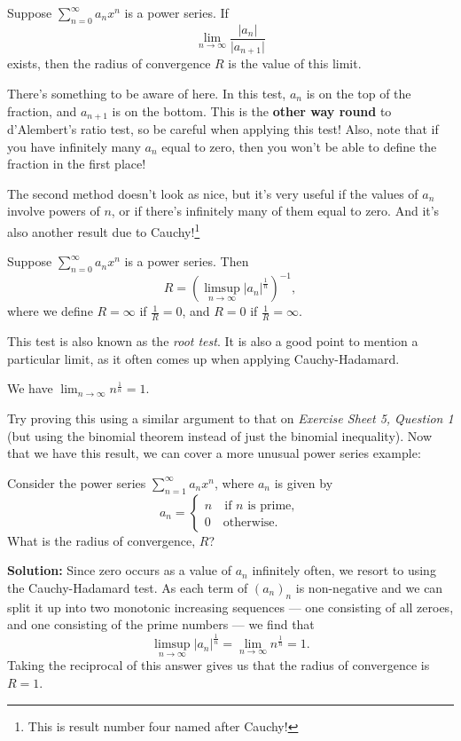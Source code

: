 \documentclass[
  10pt,
  a4paper]{article}
\theoremstyle{plain}
\theoremstyle{definition}
\theoremstyle{plain}
\theoremstyle{plain}
\theoremstyle{plain}
\theoremstyle{plain}
\theoremstyle{definition}
\theoremstyle{definition}
\theoremstyle{remark}
\theoremstyle{remark}
\let\BeginKnitrBlock\begin \let\EndKnitrBlock\end
\begin{document}
\BeginKnitrBlock{theorem}
{\label{thm:thm4} }Suppose \(\sum_{n = 0}^{\infty} a_n x^n\) is a power series. If \[\lim_{n \to \infty} \frac{\lvert a_n \rvert}{\lvert a_{n+1}\rvert}\] exists, then the radius of convergence \(R\) is the value of this limit.
\EndKnitrBlock{theorem}
There's something to be aware of here. In this test, \(a_n\) is on the top of the fraction, and \(a_{n+1}\) is on the bottom. This is the \textbf{other way round} to d'Alembert's ratio test, so be careful when applying this test! Also, note that if you have infinitely many \(a_n\) equal to zero, then you won't be able to define the fraction in the first place!

The second method doesn't look as nice, but it's very useful if the values of \(a_n\) involve powers of \(n\), or if there's infinitely many of them equal to zero. And it's also another result due to Cauchy!\footnote{This is result number four named after Cauchy!}

\BeginKnitrBlock{theorem}[Cauchy-Hadamard]
{\label{thm:thm5} }Suppose \(\sum_{n = 0}^{\infty} a_n x^n\) is a power series. Then \[R = \left(\limsup_{n\to\infty}\lvert a_n \rvert^{\frac{1}{n}}\right)^{-1},\] where we define \(R = \infty\) if \(\frac{1}{R} = 0\), and \(R = 0\) if \(\frac{1}{R} = \infty\).
\EndKnitrBlock{theorem}
This test is also known as the \emph{root test}. It is also a good point to mention a particular limit, as it often comes up when applying Cauchy-Hadamard.

\BeginKnitrBlock{proposition}
{\label{prp:prop2} }We have \(\lim_{n \to \infty} n^{\frac{1}{n}} = 1\).
\EndKnitrBlock{proposition}
Try proving this using a similar argument to that on \emph{Exercise Sheet 5, Question 1} (but using the binomial theorem instead of just the binomial inequality). Now that we have this result, we can cover a more unusual power series example:

\BeginKnitrBlock{example}
{\label{exm:ex2} }Consider the power series \(\sum_{n=1}^{\infty}a_n x^n\), where \(a_n\) is given by \[a_n = \begin{cases}
n \quad \text{if $n$ is prime},\\
0 \quad \text{otherwise}.
\end{cases}\]
What is the radius of convergence, \(R\)?
\EndKnitrBlock{example}
\textbf{Solution:}
Since zero occurs as a value of \(a_n\) infinitely often, we resort to using the Cauchy-Hadamard test. As each term of \((a_n)_n\) is non-negative and we can split it up into two monotonic increasing sequences --- one consisting of all zeroes, and one consisting of the prime numbers --- we find that \[\limsup_{n\to\infty}\lvert a_n \rvert^{\frac{1}{n}} = \lim_{n \to \infty} n^{\frac{1}{n}} = 1.\] Taking the reciprocal of this answer gives us that the radius of convergence is \(R = 1\).
\end{document}
